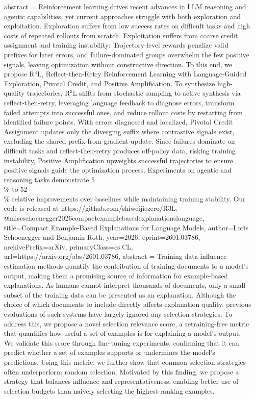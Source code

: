 {      abstract = {Reinforcement learning drives recent advances in LLM reasoning and agentic capabilities, yet current approaches struggle with both exploration and exploitation. Exploration suffers from low success rates on difficult tasks and high costs of repeated rollouts from scratch. Exploitation suffers from coarse credit assignment and training instability: Trajectory-level rewards penalize valid prefixes for later errors, and failure-dominated groups overwhelm the few positive signals, leaving optimization without constructive direction. To this end, we propose R$^3$L, Reflect-then-Retry Reinforcement Learning with Language-Guided Exploration, Pivotal Credit, and Positive Amplification. To synthesize high-quality trajectories, R$^3$L shifts from stochastic sampling to active synthesis via reflect-then-retry, leveraging language feedback to diagnose errors, transform failed attempts into successful ones, and reduce rollout costs by restarting from identified failure points. With errors diagnosed and localized, Pivotal Credit Assignment updates only the diverging suffix where contrastive signals exist, excluding the shared prefix from gradient update. Since failures dominate on difficult tasks and reflect-then-retry produces off-policy data, risking training instability, Positive Amplification upweights successful trajectories to ensure positive signals guide the optimization process. Experiments on agentic and reasoning tasks demonstrate 5\\\% to 52\\\% relative improvements over baselines while maintaining training stability. Our code is released at https://github.com/shiweijiezero/R3L.}
}@misc{schoenegger2026compactexamplebasedexplanationslanguage,
      title={Compact Example-Based Explanations for Language Models}, 
      author={Loris Schoenegger and Benjamin Roth},
      year={2026},
      eprint={2601.03786},
      archivePrefix={arXiv},
      primaryClass={cs.CL},
      url={https://arxiv.org/abs/2601.03786},
      abstract = {Training data influence estimation methods quantify the contribution of training documents to a model's output, making them a promising source of information for example-based explanations. As humans cannot interpret thousands of documents, only a small subset of the training data can be presented as an explanation. Although the choice of which documents to include directly affects explanation quality, previous evaluations of such systems have largely ignored any selection strategies. To address this, we propose a novel selection relevance score, a retraining-free metric that quantifies how useful a set of examples is for explaining a model's output. We validate this score through fine-tuning experiments, confirming that it can predict whether a set of examples supports or undermines the model's predictions. Using this metric, we further show that common selection strategies often underperform random selection. Motivated by this finding, we propose a strategy that balances influence and representativeness, enabling better use of selection budgets than naively selecting the highest-ranking examples.}
}
